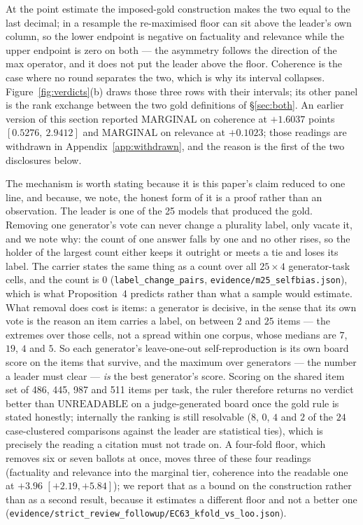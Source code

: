 \documentclass{article}
\newcommand{\ids}[1]{\texttt{\small #1}} %
\begin{document}
At the point estimate the imposed-gold construction makes the two equal to the last decimal; in a resample the re-maximised floor can sit above the leader's own column, so the lower endpoint is negative on factuality and relevance while the upper endpoint is zero on both --- the asymmetry follows the direction of the max operator, and it does not put the leader above the floor. Coherence is the case where no round separates the two, which is why its interval collapses. Figure~\ref{fig:verdicts}(b) draws those three rows with
their intervals; its other panel is the rank exchange between the two gold definitions of \S\ref{sec:both}.
An earlier version of this section reported
$\mathrm{MARGINAL}$ on coherence at $+1.6037$ points $[0.5276,\ 2.9412]$ and $\mathrm{MARGINAL}$ on relevance at
$+0.1023$; those readings are withdrawn in Appendix~\ref{app:withdrawn}, and the reason is the first of the two
disclosures below.

The mechanism is worth stating because it is this paper's claim reduced to one line, and because, we note,
the honest form of it is a proof rather than an observation. The leader is one of the 25 models that produced the gold.
Removing one generator's vote can never change a plurality label, only vacate it, and we note why: the count of one answer
falls by one and no other rises, so the holder of the largest count either keeps it outright or meets a tie
and loses its label. The carrier states the same thing as a count over all $25\times4$ generator-task cells,
and the count is $0$ (\texttt{label\_change\_pairs}, \ids{evidence/m25\_selfbias.json}), which is what
Proposition~4 predicts rather than what a sample would estimate. What removal does cost is items: a generator
is decisive, in the sense that its own vote is the reason an item carries a label, on between $2$ and $25$
items --- the extremes over those cells, not a spread within one corpus, whose medians are $7$, $19$, $4$ and
$5$. So each generator's leave-one-out self-reproduction is its own board score on the items that survive,
and the maximum over generators --- the number a leader must clear --- \emph{is} the best generator's score.
Scoring on the shared item set of 486, 445, 987 and 511 items per task, the ruler therefore returns no verdict
better than $\mathrm{UNREADABLE}$ on a judge-generated board once the gold rule is stated honestly; internally
the ranking is still resolvable ($8$, $0$, $4$ and $2$ of the $24$ case-clustered comparisons against the leader
are statistical ties), which is precisely the reading a citation must not trade on. A four-fold floor, which removes six or seven ballots at once, moves three of these four readings (factuality and relevance into the marginal tier, coherence into the readable one at $+3.96$ $[+2.19,+5.84]$); we report that as a bound on the construction rather than as a second result, because it estimates a different floor and not a better one (\ids{evidence/strict\_review\_followup/EC63\_kfold\_vs\_loo.json}).
\end{document}
